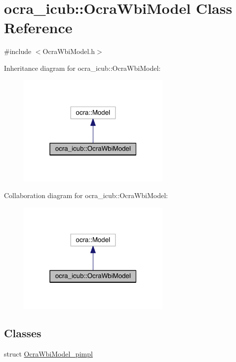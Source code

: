 \hypertarget{classocra__icub_1_1OcraWbiModel}{}\section{ocra\+\_\+icub\+:\+:Ocra\+Wbi\+Model Class Reference}
\label{classocra__icub_1_1OcraWbiModel}


{\ttfamily \#include $<$Ocra\+Wbi\+Model.\+h$>$}



Inheritance diagram for ocra\+\_\+icub\+:\+:Ocra\+Wbi\+Model\+:\nopagebreak
\begin{figure}[H]
\begin{center}
\leavevmode
\includegraphics[width=211pt]{classocra__icub_1_1OcraWbiModel__inherit__graph}
\end{center}
\end{figure}


Collaboration diagram for ocra\+\_\+icub\+:\+:Ocra\+Wbi\+Model\+:\nopagebreak
\begin{figure}[H]
\begin{center}
\leavevmode
\includegraphics[width=211pt]{classocra__icub_1_1OcraWbiModel__coll__graph}
\end{center}
\end{figure}
\subsection*{Classes}
\begin{DoxyCompactItemize}
\item 
struct \hyperlink{structOcraWbiModel_1_1OcraWbiModel__pimpl}{Ocra\+Wbi\+Model\+\_\+pimpl}
\end{DoxyCompactItemize}
